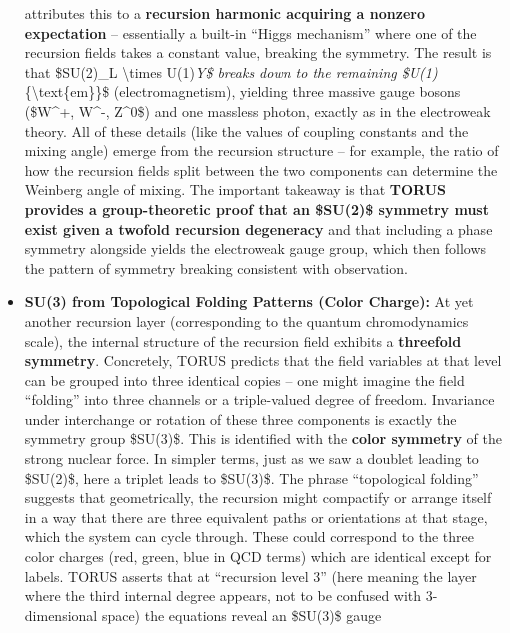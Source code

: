 \documentclass[
]{article}
\begin{document}
\begin{itemize}
  attributes this to a \textbf{recursion harmonic acquiring a nonzero
  expectation} -- essentially a built-in ``Higgs mechanism'' where one
  of the recursion fields takes a constant value, breaking the
  symmetry\hspace{0pt}. The result is that \$SU(2)\_L
  \textbackslash times U(1)\emph{Y\$ breaks down to the remaining
  \$U(1)}\{\textbackslash text\{em\}\}\$ (electromagnetism), yielding
  three massive gauge bosons (\$W\^{}+, W\^{}-, Z\^{}0\$) and one
  massless photon, exactly as in the electroweak theory\hspace{0pt}. All
  of these details (like the values of coupling constants and the mixing
  angle) emerge from the recursion structure -- for example, the ratio
  of how the recursion fields split between the two components can
  determine the Weinberg angle of mixing\hspace{0pt}. The important
  takeaway is that \textbf{TORUS provides a group-theoretic proof that
  an \$SU(2)\$ symmetry must exist given a twofold recursion degeneracy}
  and that including a phase symmetry alongside yields the electroweak
  gauge group, which then follows the pattern of symmetry breaking
  consistent with observation.
\item
  \textbf{SU(3) from Topological Folding Patterns (Color Charge):} At
  yet another recursion layer (corresponding to the quantum
  chromodynamics scale), the internal structure of the recursion field
  exhibits a \textbf{threefold symmetry}. Concretely, TORUS predicts
  that the field variables at that level can be grouped into three
  identical copies -- one might imagine the field ``folding'' into three
  channels or a triple-valued degree of freedom\hspace{0pt}. Invariance
  under interchange or rotation of these three components is exactly the
  symmetry group \$SU(3)\$. This is identified with the \textbf{color
  symmetry} of the strong nuclear force. In simpler terms, just as we
  saw a doublet leading to \$SU(2)\$, here a triplet leads to \$SU(3)\$.
  The phrase ``topological folding'' suggests that geometrically, the
  recursion might compactify or arrange itself in a way that there are
  three equivalent paths or orientations at that stage, which the system
  can cycle through. These could correspond to the three color charges
  (red, green, blue in QCD terms) which are identical except for labels.
  TORUS asserts that at ``recursion level 3'' (here meaning the layer
  where the third internal degree appears, not to be confused with
  3-dimensional space) the equations reveal an \$SU(3)\$ gauge

\end{itemize}
\end{document}
